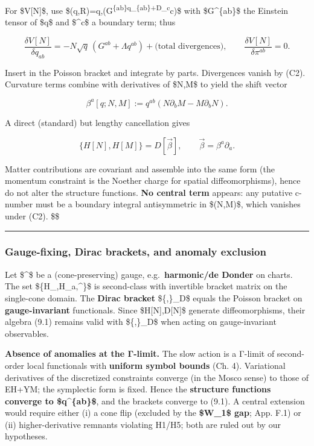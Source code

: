 \documentclass[
]{article}
\numberwithin{equation}{section}
\begin{document}
For \$V{[}N{]}\$, use
\$\delta(\sqrt q,R)=\sqrt q,(G\textsuperscript{\{ab\}\delta q\_\{ab\}+D\_c\Theta}c)\$
with \$G\^{}\{ab\}\$ the Einstein tensor of \$q\$ and \$\Theta\^{}c\$ a
boundary term; thus

\[
\frac{\delta V[N]}{\delta q_{ab}}= -N\sqrt q\,(G^{ab}+\Lambda q^{ab}) + \text{(total divergences)},\qquad \frac{\delta V[N]}{\delta \pi^{ab}}=0.
\]

Insert in the Poisson bracket and integrate by parts. Divergences vanish
by (C2). Curvature terms combine with derivatives of \$N,M\$ to yield
the shift vector

\[
\beta^a[q;N,M]:=q^{ab}(N\partial_b M-M\partial_b N).
\]

A direct (standard) but lengthy cancellation gives

\[
\{H[N],H[M]\}=D[\vec\beta],\qquad \vec\beta=\beta^a\partial_a.
\]

Matter contributions are covariant and assemble into the same form (the
momentum constraint is the Noether charge for spatial diffeomorphisms),
hence do not alter the structure functions. \textbf{No central term}
appears: any putative c-number must be a boundary integral antisymmetric
in \$(N,M)\$, which vanishes under (C2). \$\square\$

\begin{center}\rule{0.5\linewidth}{0.5pt}\end{center}

\hypertarget{gauge-fixing-dirac-brackets-and-anomaly-exclusion}{%
\subsubsection{Gauge-fixing, Dirac brackets, and anomaly
exclusion}\label{gauge-fixing-dirac-brackets-and-anomaly-exclusion}}

Let \$\chi\^{}\$ be a (cone-preserving) gauge,
e.g.~\textbf{harmonic/de Donder} on charts. The set
\$\{\mathcal H\_\perp,\mathcal H\_a,\chi\^{}\mu\}\$ is second-class with
invertible bracket matrix on the single-cone domain. The \textbf{Dirac
bracket} \$\{\cdot,\cdot\}\_D\$ equals the Poisson bracket on
\textbf{gauge-invariant} functionals. Since \$H{[}N{]},D{[}\vec N{]}\$
generate diffeomorphisms, their algebra (9.1) remains valid with
\$\{\cdot,\cdot\}\_D\$ when acting on gauge-invariant observables.

\textbf{Absence of anomalies at the Γ-limit.} The slow action is a
Γ-limit of second-order local functionals with \textbf{uniform symbol
bounds} (Ch. 4). Variational derivatives of the discretized constraints
converge (in the Mosco sense) to those of EH+YM; the symplectic form is
fixed. Hence the \textbf{structure functions converge to
\$q\^{}\{ab\}\$}, and the brackets converge to (9.1). A central
extension would require either (i) a cone flip (excluded by the
\textbf{\$W\_1\$ gap}; App. F.1) or (ii) higher-derivative remnants
violating H1/H5; both are ruled out by our hypotheses.
\end{document}
